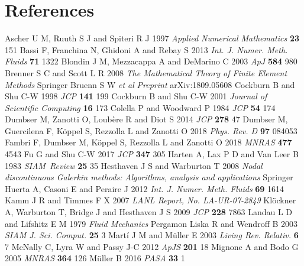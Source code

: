 \documentclass[letterpaper]{jpconf}
\begin{document}
\section*{References}
\begin{thebibliography}{36}
   Ascher U M, Ruuth S J and Spiteri R J 1997 {\it Applied Numerical Mathematics} {\bf 23} 151
   Bassi F, Franchina N, Ghidoni A and Rebay S 2013 {\it Int. J. Numer. Meth. Fluids} {\bf 71} 1322
   Blondin J M, Mezzacappa A and DeMarino C 2003 {\it ApJ} {\bf 584} 980
   Brenner S C and Scott L R 2008 {\it The Mathematical Theory of Finite Element Methods} Springer
   Bruenn S W {\it et al} {\it Preprint} arXiv:1809.05608
   Cockburn B and Shu C-W 1998 {\it JCP} {\bf 141} 199
   Cockburn B and Shu C-W 2001 {\it Journal of Scientific Computing} {\bf 16} 173
   Colella P and Woodward P 1984 {\it JCP} {\bf 54} 174
   Dumbser M, Zanotti O, Loub{\`e}re R and Diot S 2014 {\it JCP} {\bf 278} 47
   Dumbser M, Guercilena F, K{\"o}ppel S, Rezzolla L and Zanotti O 2018 {\it Phys. Rev. D} {\bf 97} 084053
   Fambri F, Dumbser M, K{\"o}ppel S, Rezzolla L and Zanotti O 2018 {\it MNRAS} {\bf 477} 4543
   Fu G and Shu C-W 2017 {\it JCP} {\bf 347} 305
   Harten A, Lax P D and Van Leer B 1983 {\it SIAM~Review} {\bf 25} 35
   Hesthaven J S and Warburton T 2008 {\it Nodal discontinuous Galerkin methods: Algorithms, analysis and applications} Springer
   Huerta A, Casoni E and Peraire J 2012 {\it Int. J. Numer. Meth. Fluids} {\bf 69} 1614
   Kamm J R and Timmes F X 2007 {\it LANL Report, No. LA-UR-07-2849}
   Kl{\"o}ckner A, Warburton T, Bridge J and Hesthaven J S 2009 {\it JCP} {\bf 228} 7863
   Landau L D and Lifshitz E M 1979 {\it Fluid Mechanics} Pergamon
   Liska R and Wendroff B 2003 {\it SIAM J. Sci. Comput.} {\bf 25} 3
   Mart{\'i} J M and M{\"u}ller E 2003 {\it Living Rev. Relativ.} {\bf 6} 7
   McNally C, Lyra W and Passy J-C 2012 {\it ApJS} {\bf 201} 18
   Mignone A and Bodo G 2005 {\it MNRAS} {\bf 364} 126
   M{\"u}ller B 2016 {\it PASA} {\bf 33} 1

\end{thebibliography}
\end{document}
